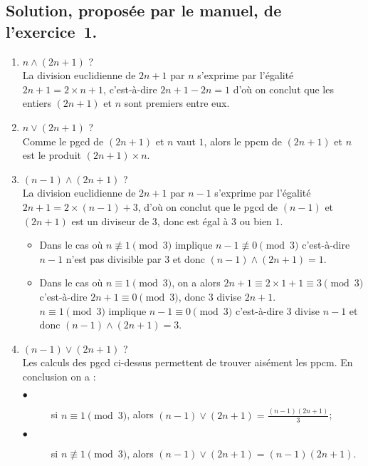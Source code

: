 \documentclass[a4paper,14pt]{extarticle} %
\begin{document}
\subsection*{Solution, proposée par le manuel, de l'exercice~1.}
\begin{enumerate}

\item $n \wedge (2n+1)$ ? \\
La division euclidienne de $2n+1$ par $n$ s'exprime par l'égalité $2n+1= 2\times n +1$, c'est-à-dire $2n+1-2n=1$ d'où on conclut que les entiers $(2n+1)$ et $n$ sont premiers entre eux.

\item $n \vee (2n+1)$ ?\\
Comme le pgcd de $(2n+1)$ et $n$ vaut $1$, alors le ppcm de $(2n+1)$ et $n$ est le produit $(2n+1) \times n$.

\item $(n-1)\wedge(2n+1)$ ? \\
La division euclidienne de $2n+1$ par $n-1$ s'exprime par l'égalité $2n+1= 2\times (n-1) +3 $,  d'où on conclut que le pgcd de $(n-1)$ et $(2n+1)$ est un diviseur de $3$, donc est égal à $3$ ou bien $1$.

\begin{itemize}

\item Dans le cas où $n \not\equiv 1 \pmod{3}$ 
 implique $n-1 \not\equiv 0 \pmod{3}$ c'est-à-dire $n-1$ n'est pas divisible par $3$  et donc $(n-1)\wedge(2n+1)=1$.
 
\item Dans le cas où $n \equiv 1 \pmod{3}$, on a alors $2n+1\equiv 2\times 1+1 \equiv 3  \pmod{3}$ c'est-à-dire $2n+1\equiv 0 \pmod{3}$, donc 3 divise $2n+1$.\\
$n \equiv 1 \pmod{3}$ implique $n-1 \equiv 0 \pmod{3}$ c'est-à-dire 3 divise $n-1$  et donc $(n-1)\wedge(2n+1)=3$.
\end{itemize}


\item $(n-1)\vee(2n+1)$ ?\\
Les calculs des pgcd ci-dessus permettent de trouver aisément les ppcm. En conclusion on a :
\begin{description}
\item[$\bullet$] si $n \equiv 1 \pmod{3}$, alors $(n-1)\vee(2n+1) = \frac{(n-1)(2n+1)}{3} $;
\item[$\bullet$] si $n \not\equiv 1 \pmod{3}$, alors $(n-1)\vee(2n+1) = (n-1)(2n+1)$. 
\end{description}


\end{enumerate}
\end{document}
